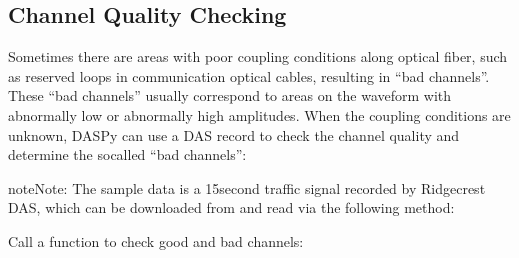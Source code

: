\documentclass[letterpaper,10pt,english]{sphinxmanual}
\let\sphinxpxdimen\pdfpxdimen\else\newdimen\sphinxpxdimen
\begin{document}
\noindent\sphinxincludegraphics[width=500\sphinxpxdimen]{{turning_points}.png}


\subsection{Channel Quality Checking}
\label{\detokenize{Channel Analysis:channel-quality-checking}}\label{\detokenize{Channel Analysis:id3}}
\sphinxAtStartPar
Sometimes there are areas with poor coupling conditions along optical fiber, such as reserved loops in communication optical cables, resulting in “bad channels”. These “bad channels” usually correspond to areas on the waveform with abnormally low or abnormally high amplitudes. When the coupling conditions are unknown, DASPy can use a DAS record to check the channel quality and determine the so\sphinxhyphen{}called “bad channels”:

\begin{sphinxadmonition}{note}{Note:}
\sphinxAtStartPar
The sample data is a 15\sphinxhyphen{}second traffic signal recorded by Ridgecrest DAS, which can be downloaded from  and read via the following method:

\begin{sphinxVerbatim}[commandchars=\\\{\}]
   
  \PYG{p}{[}\PYG{p}{]}
    
\end{sphinxVerbatim}
\end{sphinxadmonition}

\sphinxAtStartPar
Call a function to check good and bad channels:
\end{document}
